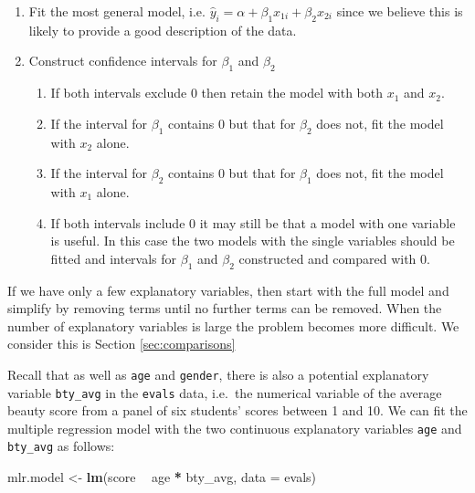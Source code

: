 \documentclass[]{article}
\newenvironment{Shaded}{\begin{snugshade}}{\end{snugshade}}
\newcommand{\KeywordTok}[1]{\textcolor[rgb]{0.13,0.29,0.53}{\textbf{#1}}}
\newcommand{\DataTypeTok}[1]{\textcolor[rgb]{0.13,0.29,0.53}{#1}}
\newcommand{\StringTok}[1]{\textcolor[rgb]{0.31,0.60,0.02}{#1}}
\newcommand{\OperatorTok}[1]{\textcolor[rgb]{0.81,0.36,0.00}{\textbf{#1}}}
\newcommand{\NormalTok}[1]{#1}
\providecommand{\tightlist}{%
  \setlength{\itemsep}{0pt}\setlength{\parskip}{0pt}}
\begin{document}
\begin{enumerate}
\def\labelenumi{\arabic{enumi}.}
\tightlist
\item
  Fit the most general model, i.e.
  \(\hat{y}_i = \alpha + \beta_1 x_{1i} + \beta_2 x_{2i}\) since we
  believe this is likely to provide a good description of the data.
\item
  Construct confidence intervals for \(\beta_1\) and \(\beta_2\)

  \begin{enumerate}
  \def\labelenumii{\alph{enumii}.}
  \tightlist
  \item
    If both intervals exclude 0 then retain the model with both \(x_1\)
    and \(x_2\).
  \item
    If the interval for \(\beta_1\) contains 0 but that for \(\beta_2\)
    does not, fit the model with \(x_2\) alone.
  \item
    If the interval for \(\beta_2\) contains 0 but that for \(\beta_1\)
    does not, fit the model with \(x_1\) alone.
  \item
    If both intervals include 0 it may still be that a model with one
    variable is useful. In this case the two models with the single
    variables should be fitted and intervals for \(\beta_1\) and
    \(\beta_2\) constructed and compared with 0.
  \end{enumerate}
\end{enumerate}

If we have only a few explanatory variables, then start with the full
model and simplify by removing terms until no further terms can be
removed. When the number of explanatory variables is large the problem
becomes more difficult. We consider this is Section
\ref{sec:comparisons}

Recall that as well as \texttt{age} and \texttt{gender}, there is also a
potential explanatory variable \texttt{bty\_avg} in the \texttt{evals}
data, i.e.~the numerical variable of the average beauty score from a
panel of six students' scores between 1 and 10. We can fit the multiple
regression model with the two continuous explanatory variables
\texttt{age} and \texttt{bty\_avg} as follows:

\begin{Shaded}
\begin{Highlighting}[]
\NormalTok{mlr.model <-}\StringTok{ }\KeywordTok{lm}\NormalTok{(score }\OperatorTok{~}\StringTok{ }\NormalTok{age }\OperatorTok{*}\StringTok{ }\NormalTok{bty_avg, }\DataTypeTok{data =}\NormalTok{ evals)}
\end{Highlighting}
\end{Shaded}
\end{document}

